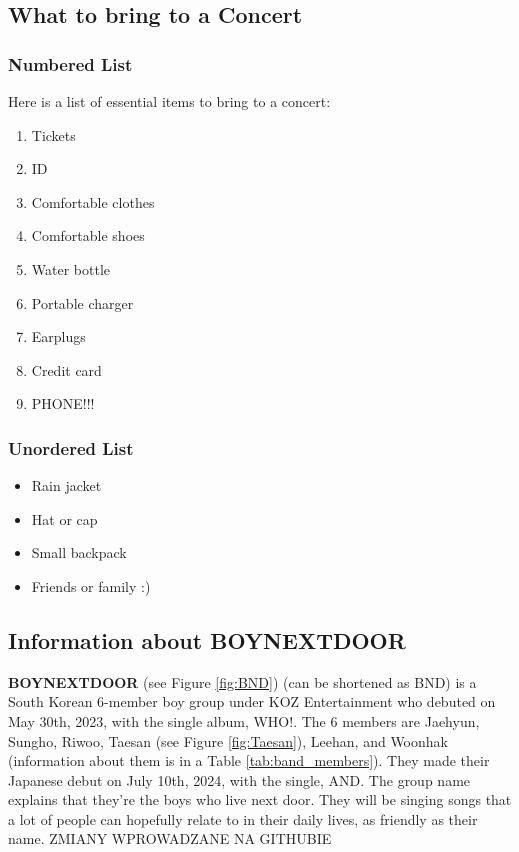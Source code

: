 
\newpage
\subsection{What to bring to a Concert}
\subsubsection{Numbered List}

Here is a list of essential items to bring to a concert:

\begin{enumerate}
    \item  Tickets
    \item ID
    \item Comfortable clothes
    \item Comfortable shoes
    \item Water bottle
    \item Portable charger
    \item Earplugs
    \item Credit card
    \item PHONE!!!

\end{enumerate}

\subsubsection{Unordered List}
\begin{itemize}
    \item Rain jacket
    \item Hat or cap
    \item Small backpack
    \item Friends or family :)
\end{itemize}

\subsection{Information about BOYNEXTDOOR}

\onehalfspacing 

\textbf{BOYNEXTDOOR} (see Figure \ref{fig:BND}) (can be shortened as BND) is a South Korean 6-member boy group under KOZ Entertainment who debuted on May 30th, 2023, with the single album, WHO!. The 6 members are Jaehyun, Sungho, Riwoo, Taesan (see Figure  \ref{fig:Taesan}), Leehan, and Woonhak (information about them is in a Table \ref{tab:band_members}). They made their Japanese debut on July 10th, 2024, with the single, AND. The group name explains that they’re the boys who live next door. They will be singing songs that a lot of people can hopefully relate to in their daily lives, as friendly as their name. ZMIANY WPROWADZANE NA GITHUBIE \par

